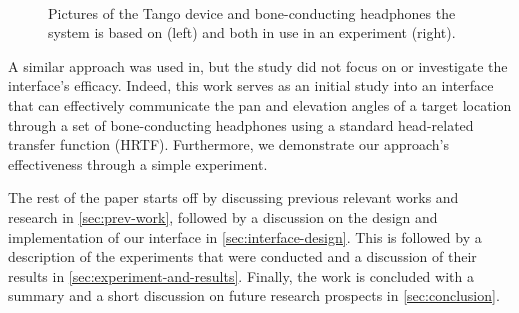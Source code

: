 \documentclass{llncs}
\begin{document}
\begin{figure}[t]
  \centering
~
  \caption{Pictures of the Tango device and bone-conducting headphones the system is based on (left) and both in use in an experiment (right).}
\end{figure}

A similar approach was used in\cite{durette2008visuo}, but the study did not focus on or investigate the interface's efficacy.
Indeed, this work serves as an initial study into an interface that can effectively communicate the pan and elevation angles of a target location through a set of bone-conducting headphones using a standard head-related transfer function (HRTF).
Furthermore, we demonstrate our approach's effectiveness through a simple experiment.

The rest of the paper starts off by discussing previous relevant works and research in \cref{sec:prev-work}, followed by a discussion on the design and implementation of our interface in \cref{sec:interface-design}.
This is followed by a description of the experiments that were conducted and a discussion of their results in \cref{sec:experiment-and-results}.
Finally, the work is concluded with a summary and a short discussion on future research prospects in \cref{sec:conclusion}.
\end{document}
